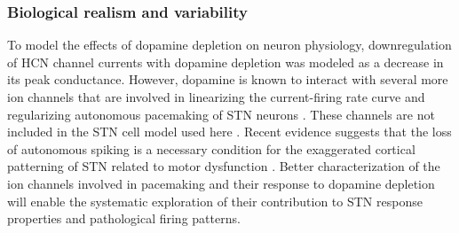 \subsubsection*{Biological realism and variability}
%

To model the effects of dopamine depletion on neuron physiology,
downregulation of HCN channel currents with dopamine depletion was modeled as a decrease in its peak conductance. However, dopamine is known to interact with several more ion channels that are involved in linearizing the current-firing rate curve and regularizing autonomous pacemaking of STN neurons \cite{ramanathan_d2-like_2008,yang_d2_2016,loucif_depolarisation_2008}. These channels are not included in the STN cell model used here \cite{gillies_membrane_2005}. Recent evidence suggests that the loss of autonomous spiking is a necessary condition for the exaggerated cortical patterning of STN related to motor dysfunction \cite{mciver_chemogenetic_2018}. Better characterization of the ion channels involved in pacemaking and their response to dopamine depletion will enable the systematic exploration of their contribution to STN response properties and pathological firing patterns.

